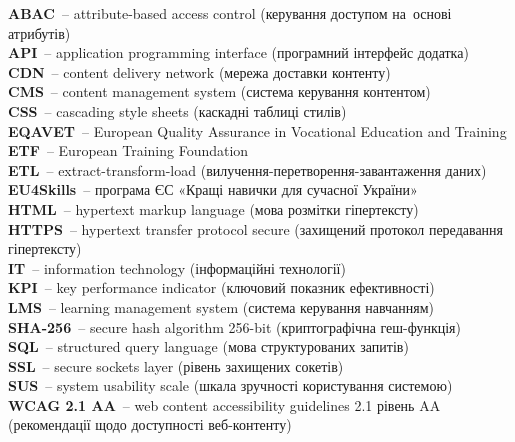 \begin{flushleft}
\vspace{0.5em}

\noindent\textbf{ABAC}~-- attribute-based access control (керування доступом на~основі атрибутів)\\[2pt]
\noindent\textbf{API}~-- application programming interface (програмний інтерфейс додатка)\\[2pt]
\noindent\textbf{CDN}~-- content delivery network (мережа доставки контенту)\\[2pt]
\noindent\textbf{CMS}~-- content management system (система керування контентом)\\[2pt]
\noindent\textbf{CSS}~-- cascading style sheets (каскадні таблиці стилів)\\[2pt]
\noindent\textbf{EQAVET}~-- European Quality Assurance in Vocational Education and Training\\[2pt]
\noindent\textbf{ETF}~-- European Training Foundation\\[2pt]
\noindent\textbf{ETL}~-- extract-transform-load (вилучення-перетворення-завантаження даних)\\[2pt]
\noindent\textbf{EU4Skills}~-- програма ЄС «Кращі навички для сучасної України»\\[2pt]
\noindent\textbf{HTML}~-- hypertext markup language (мова розмітки гіпертексту)\\[2pt]
\noindent\textbf{HTTPS}~-- hypertext transfer protocol secure (захищений протокол передавання гіпертексту)\\[2pt]
\noindent\textbf{IT}~-- information technology (інформаційні технології)\\[2pt]
\noindent\textbf{KPI}~-- key performance indicator (ключовий показник ефективності)\\[2pt]
\noindent\textbf{LMS}~-- learning management system (система керування навчанням)\\[2pt]
\noindent\textbf{SHA-256}~-- secure hash algorithm 256-bit (криптографічна геш-функція)\\[2pt]
\noindent\textbf{SQL}~-- structured query language (мова структурованих запитів)\\[2pt]
\noindent\textbf{SSL}~-- secure sockets layer (рівень захищених сокетів)\\[2pt]
\noindent\textbf{SUS}~-- system usability scale (шкала зручності користування системою)\\[2pt]
\noindent\textbf{WCAG 2.1 AA}~-- web content accessibility guidelines 2.1 рівень AA (рекомендації щодо доступності веб-контенту)

\end{flushleft}

\clearpage
